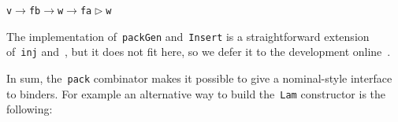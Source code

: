 \documentclass[9pt,authoryear]{sigplanconf}
\begin{document}
{{}\vphantom{$\{$}}\texttt{\mbox{\hspace{0.50em}}}\texttt{\mbox{\hspace{0.50em}}}\texttt{\mbox{\hspace{0.50em}}}\texttt{\mbox{\hspace{0.50em}}}\texttt{\mbox{\hspace{0.50em}}}\texttt{\mbox{\hspace{0.50em}}}\texttt{\mbox{\hspace{0.50em}}}\texttt{\mbox{\hspace{0.50em}}}\texttt{\mbox{\hspace{0.50em}}}\texttt{\mbox{\hspace{0.50em}}}\texttt{\mbox{\hspace{0.50em}}}\texttt{v}\texttt{\mbox{\hspace{0.50em}}}\texttt{$ \rightarrow $}\texttt{\mbox{\hspace{0.50em}}}\texttt{f}\texttt{\mbox{\hspace{0.50em}}}\texttt{b}\texttt{\mbox{\hspace{0.50em}}}\texttt{$ \rightarrow $}\texttt{\mbox{\hspace{0.50em}}}\texttt{\makebox[1.22ex][l]{$ {(} $}}\texttt{w}\texttt{\mbox{\hspace{0.50em}}}\texttt{$ \rightarrow $}\texttt{\mbox{\hspace{0.50em}}}\texttt{f}\texttt{\mbox{\hspace{0.50em}}}\texttt{\makebox[1.22ex][l]{$ {(} $}}\texttt{a}\texttt{\mbox{\hspace{0.50em}}}\texttt{$ \vartriangleright $}\texttt{\mbox{\hspace{0.50em}}}\texttt{w}\texttt{\makebox[1.22ex][r]{$ {)} $}}\texttt{\makebox[1.22ex][r]{$ {)} $}}\texttt{{\nopagebreak \newline%
}\vphantom{$\{$}}%


%
The implementation of{~}\texttt{packGen} and{~}\texttt{Insert} is a
    straightforward extension of{~}\texttt{inj} and{~}\texttt{\makebox[1.22ex][l]{$ {(} $}}\texttt{\makebox[1.22ex][c]{$ \in $}}\texttt{\makebox[1.22ex][r]{$ {)} $}}, but
    it does not fit here, so we defer it to the development
    online{~}\cite{namesforfreerepo}.%


%
In sum, the{~}\texttt{pack} combinator makes it possible to give a
    nominal-style interface to binders. For example an alternative way
    to build the{~}\texttt{Lam} constructor is the following{:}%
\end{document}
